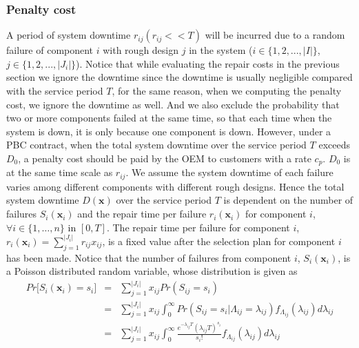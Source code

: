 \documentclass[preprint,12pt]{elsarticle}
\begin{document}
\subsubsection{Penalty cost}
A period of system downtime $r_{ij}(r_{ij}<<T)$ will be incurred due to a random failure of component $i$ with rough design $j$ in the system ($i \in \{1,2,...,\rvert I \lvert \}$, $j \in \{1,2,...,\rvert J_{i} \lvert \}$).
Notice that while evaluating the repair costs in the previous section we ignore the downtime since the downtime is usually negligible compared with the service period $T$, for the same reason, when we computing the penalty cost, we ignore the downtime as well. And we also exclude the probability that two or more components failed at the same time, so that each time when the system is down, it is only because one component is down.
However, under a PBC contract, when the total system downtime over the service period $T$ exceeds $D_0$, a penalty cost should be paid by the OEM to customers with a rate $c_p$. $D_0$ is at the same time scale as $r_{ij}$. We assume the system downtime of each failure varies among different components with different rough designs. Hence the total system downtime $D{(\boldsymbol{x})}$ over the service period $T$ is dependent on the number of failures $S_{i}(\boldsymbol{x}_{i})$ and the repair time per failure $r_{i}(\boldsymbol{x}_{i})$ for component $i$,$\forall i\in \{1,\dots,n\}$ in $[0,T]$. The repair time per failure for component $i$, $r_{i}(\boldsymbol{x}_{i})=\sum_{j=1}^{\rvert J_{i} \lvert}{r_{ij}x_{ij}}$, is a fixed value after the selection plan for component $i$ has been made. Notice that the number of failures from component $i$, $S_{i}(\boldsymbol{x}_{i})$, is a Poisson distributed random variable, whose distribution is given as
\small
\begin{eqnarray}
Pr\bigg[S_{i}(\boldsymbol{x}_{i})=s_{i}\bigg] &=&\sum^{\rvert J_{i} \lvert}_{j=1}{x_{ij}Pr(S_{ij}=s_{i})} \nonumber\\
&=&\sum^{\rvert J_{i} \lvert}_{j=1}{x_{ij}\int^{\infty}_{0}Pr(S_{ij}=s_{i}|\Lambda_{ij}=\lambda_{ij})f_{\Lambda_{ij}}(\lambda_{ij})d\lambda_{ij}} \nonumber\\
&=&\sum^{\rvert J_{i} \lvert}_{j=1}{x_{ij}\int^{\infty}_{0}{\frac{e^{-\lambda_{ij}T}(\lambda_{ij}T)^{s_{i}}}{s_{i}!}f_{\Lambda_{ij}}(\lambda_{ij})}d\lambda_{ij}}
\end{eqnarray}
\normalsize
\end{document}
